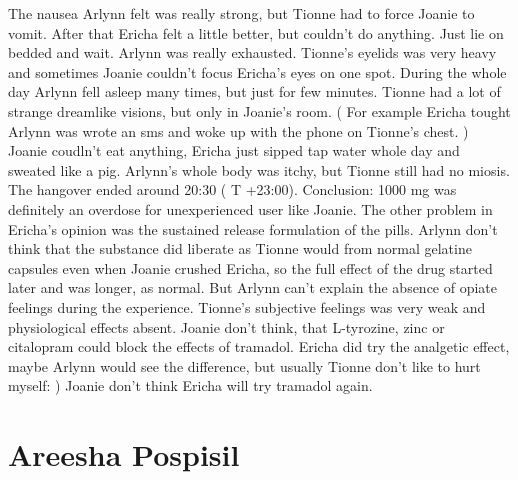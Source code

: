 \documentclass[12pt]{book}
\begin{document}
The nausea Arlynn felt was really strong, but Tionne had to force Joanie to vomit. After that Ericha felt a little better, but couldn't do anything. Just lie on bedded and wait. Arlynn was really exhausted. Tionne's eyelids was very heavy and sometimes Joanie couldn't focus Ericha's eyes on one spot. During the whole day Arlynn fell asleep many times, but just for few minutes. Tionne had a lot of strange dreamlike visions, but only in Joanie's room. ( For example Ericha tought Arlynn was wrote an sms and woke up with the phone on Tionne's chest. ) Joanie coudln't eat anything, Ericha just sipped tap water whole day and sweated like a pig. Arlynn's whole body was itchy, but Tionne still had no miosis. The hangover ended around 20:30 ( T +23:00). Conclusion: 1000 mg was definitely an overdose for unexperienced user like Joanie. The other problem in Ericha's opinion was the sustained release formulation of the pills. Arlynn don't think that the substance did liberate as Tionne would from normal gelatine capsules even when Joanie crushed Ericha, so the full effect of the drug started later and was longer, as normal. But Arlynn can't explain the absence of opiate feelings during the experience. Tionne's subjective feelings was very weak and physiological effects absent. Joanie don't think, that L-tyrozine, zinc or citalopram could block the effects of tramadol. Ericha did try the analgetic effect, maybe Arlynn would see the difference, but usually Tionne don't like to hurt myself: ) Joanie don't think Ericha will try tramadol again.






\chapter{Areesha Pospisil}
\end{document}
